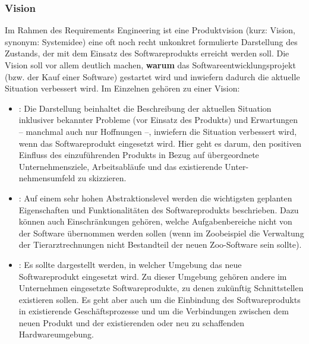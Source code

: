 \subsubsection{Vision}
\label{sec:Kap-6.1.2.1}

Im Rahmen des Requirements Engineering ist eine Produktvision (kurz: Vision, synonym: Systemidee) eine oft noch recht unkonkret formulierte Darstellung des Zustands, der mit dem Einsatz des Softwareprodukts erreicht werden soll. Die Vision soll vor allem deutlich machen, \textbf{warum} das Softwareentwicklungsprojekt (bzw. der Kauf einer Software) gestartet wird und inwiefern dadurch die aktuelle Situation verbessert wird. Im Einzelnen gehören zu einer Vision:

\begin{itemize}
	\item \textbf{}: Die Darstellung beinhaltet die Beschreibung der aktuellen Situation inklusiver bekannter Probleme (vor Einsatz des Produkts) und Erwartungen -- manchmal auch nur Hoffnungen --, inwiefern die \mbox{Situation} verbessert wird, wenn das Softwareprodukt eingesetzt wird. Hier geht es darum, den positiven Einfluss des einzuführenden Produkts in Bezug auf über\-geordnete Unternehmensziele, Arbeitsabläufe und das existierende Unter-
			\linebreak %
			nehmensumfeld zu skizzieren. 
	\item \textbf{}: Auf einem sehr hohen Abstraktionslevel werden die wichtigsten geplanten Eigenschaften und Funktionalitäten des Softwareprodukts beschrieben. Dazu können auch Einschränkungen gehören, welche Aufgaben\-bereiche nicht von der Software übernommen werden sollen (\zb wenn im Zoobeispiel die Verwaltung der Tierarztrechnungen nicht Bestandteil der \mbox{neuen} Zoo-Software sein sollte).
	\item \textbf{}: Es sollte dargestellt werden, in welcher Umgebung das neue Softwareprodukt eingesetzt wird. Zu dieser Umgebung gehören andere im Unternehmen eingesetzte Softwareprodukte, zu denen zukünftig Schnittstellen existieren sollen. Es geht aber auch um die Einbindung des Softwareprodukts in existierende Geschäfts\-prozesse und um die Verbindungen zwischen dem neuen Produkt und der existierenden oder neu zu schaffenden Hardwareumgebung.
\end{itemize}

